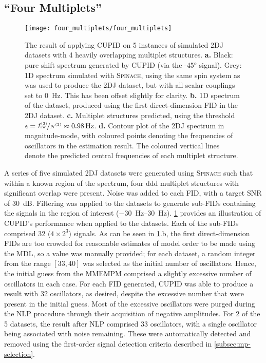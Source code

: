 \subsection{``Four Multiplets''}
\label{subsec:four-mp}
\begin{figure}
    \centering
    \texttt{[image: four\_multiplets/four\_multiplets]}
    \caption[
        The result of applying \acs{CUPID} on 5 instances of simulated
        \acs{2DJ} datasets with 4 heavily overlapping multiplet structures.
    ]{
        The result of applying \ac{CUPID} on 5 instances of simulated \ac{2DJ}
        datasets with 4 heavily overlapping multiplet structures.
        \textbf{a.} Black: pure shift spectrum generated by \ac{CUPID} (via the
        \ang{-45} signal).
        Grey: \ac{1D} spectrum simulated with \textsc{Spinach}, using the same spin
        system as was used to produce the \ac{2DJ} dataset, but with all scalar
        couplings set to \qty{0}{\hertz}. This has been offset slightly for
        clarity.
        \textbf{b.} \ac{1D} spectrum of the dataset, produced using the first
        direct-dimension \ac{FID} in the \ac{2DJ} dataset.
        \textbf{c.} Multiplet structures predicted, using the threshold $\epsilon
        = \nicefrac{\fswtwo}{\Ntwo} \approx \qty{0.98}{\hertz}$.
        \textbf{d.} Contour plot of the \ac{2DJ} spectrum in magnitude-mode,
        with coloured points denoting the frequencies of oscillators in the
        estimation result. The coloured vertical lines denote the predicted
        central frequencies of each multiplet structure.
    }
    \label{fig:four-multiplets}
\end{figure}

A series of five simulated \ac{2DJ} datasets
were generated using \textsc{Spinach} such that within a
known region of the spectrum, four ddd multiplet
structures with significant overlap were present. Noise was added to each
\ac{FID}, with a target \ac{SNR} of \qty{30}{\deci\bel}.
Filtering was applied to the datasets to generate sub-\acp{FID} containing the
signals in the region of interest
(\SIrange{-30}{30}{\hertz}).
\cref{fig:four-multiplets} provides an illustration of \ac{CUPID}'s performance
when applied to the datasets.
Each of the sub-\acp{FID} comprised 32 ($4 \times 2^3$) signals.
As can be seen in \cref{fig:four-multiplets}.b, the first direct-dimension
\acp{FID} are too crowded for reasonable estimates of model
order to be made using the \ac{MDL}, so a value was manually provided; for each
dataset, a random
integer from the range $[33, 40]$ was selected as the initial number of
oscillators. Hence, the initial guess from the \ac{MMEMPM} comprised a
slightly excessive number of oscillators in each case.
For each \ac{FID} generated, \ac{CUPID} was able to produce a
result with 32 oscillators, as desired, despite the excessive number
that were present in the initial guess. Most of the excessive oscillators were
purged during the \ac{NLP} procedure through their acquisition of negative
amplitudes.
For 2 of the 5 datasets, the result after \ac{NLP} comprised 33
oscillators, with a single oscillator being associated with noise remaining.
These were automatically detected and removed using the first-order signal
detection criteria described in \cref{subsec:mp-selection}.

